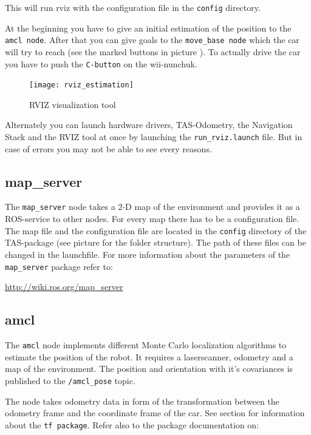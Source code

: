 This will run rviz with the configuration file in the \texttt{config} directory. 

At the beginning you have to give an initial estimation of the position to the \texttt{amcl node}. After that you can give goals to the \texttt{move\_base node} which the car will try to reach (see the marked buttons in picture ). To actually drive the car you have to push the \texttt{C-button} on the wii-nunchuk. 

\begin{figure}[h]
	\centering
		\texttt{[image: rviz\_estimation]}
	\caption{RVIZ visualization tool}
	\label{fig:rviz_estimation}
\end{figure}


Alternately you can launch hardware drivers, TAS-Odometry, the Navigation Stack and the RVIZ tool at once by launching the \texttt{run\_rviz.launch} file. But in case of errors you may not be able to see every reasons.

\subsection{map\_server}
\label{sec:tas_package_map_server}
The \texttt{map\_server} node takes a 2-D map of the environment and provides it as a ROS-service to other nodes. For every map there has to be a configuration file. The map file and the configuration file are located in the \texttt{config} directory of the TAS-package (see picture  for the folder structure). The path of these files can be changed in the launchfile. For more information about the parameters of the \texttt{map\_server} package refer to:

\hyperref[http://wiki.ros.org/map_server]{http://wiki.ros.org/map\_server}


\subsection{amcl}
\label{sec:tas_package_amcl}
The \texttt{amcl} node implements different Monte Carlo localization algorithms to estimate the position of the robot. It requires a laserscanner, odometry and a map of the environment. The position and orientation with it's covariances is published to the \texttt{/amcl\_pose} topic.

The node takes odometry data in form of the transformation between the odometry frame and the coordinate frame of the car. See section  for information about the \texttt{tf package}. Refer also to the package documentation on:

